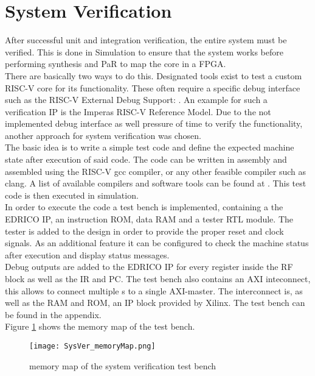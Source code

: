 \section{System Verification}
After successful unit and integration verification, the entire system must be verified. This is done in Simulation to ensure that the system works before performing synthesis and \ac{PaR} to map the core in a \ac{FPGA}.\\
There are basically two ways to do this. Designated tools exist to test a custom RISC-V core for its functionality. These often require a specific debug interface such as the RISC-V External Debug Support: \cite{riscv:debug}. An example for such a verification IP is the Imperas RISC-V Reference Model. Due to the not implemented debug interface as well pressure of time to verify the functionality, another approach for system verification was chosen. \\
The basic idea is to write a simple test code and define the expected machine state after execution of said code. The code can be written in assembly and assembled using the RISC-V gcc compiler, or any other feasible compiler such as clang. A list of available compilers and software tools can be found at \cite{RV:software}. This test code is then executed in simulation.\\
In order to execute the code a test bench is implemented, containing a the \ac{EDRICO} \ac{IP}, an instruction \ac{ROM}, data \ac{RAM} and a tester \ac{RTL} module. The tester is added to the design in order to provide the proper reset and clock signals. As an additional feature it can be configured to check the machine status after execution and display status messages.\\
Debug outputs are added to the \ac{EDRICO} \ac{IP} for every register inside the \ac{RF} block as well as the \ac{IR} and \ac{PC}. The test bench also contains an AXI inteconnect, this allows to connect multiple s to a single AXI-master. The interconnect is, as well as the \ac{RAM} and \ac{ROM}, an \ac{IP} block provided by Xilinx. The test bench can be found in the appendix.\\
Figure \ref{fig:SysVerMM} shows the memory map of the test bench.


\begin{figure}[H]
	\centering
	\texttt{[image: SysVer\_memoryMap.png]}
	\caption{memory map of the system verification test bench}
	\label{fig:SysVerMM}
\end{figure}

